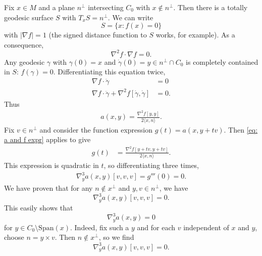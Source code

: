 \documentclass{article}
\numberwithin{equation}{section}
\theoremstyle{plain}
\begin{document}
    
    Fix $x \in M$ and a plane $n^\perp$ intersecting $C_0$ with $x \notin n^\perp$. Then there is a totally geodesic surface $S$ with $T_x S = n^\perp$. We can write 
    \begin{equation}
    S = \{x : f(x) = 0\}
    \end{equation}
     with $|\nabla f| = 1$ (the signed distance function to $S$ works, for example). As a consequence, 
     \begin{equation}
     \nabla^2 f \cdot\nabla f = 0.
     \end{equation}
      Any geodesic $\gamma$ with $\gamma(0) = x$ and $\dot \gamma(0) = y \in n^\perp \cap C_0$ is completely contained in $S$: $f(\gamma) = 0$. Differentiating this equation twice,
    \begin{align}
        \nabla f \cdot \dot \gamma &= 0 \\
        \nabla f \cdot \ddot \gamma + \nabla^2 f[\dot \gamma, \dot \gamma] &= 0.
    \end{align}
    Thus 
    \begin{align} \label{eq: a and f expr}
        a(x,y) = \frac{ \nabla^2 f[y,y]}{2\langle x,n\rangle}.
    \end{align}
    Fix $v \in n^\perp$ and consider the function expression $g(t) = a(x, y+tv)$. Then \eqref{eq: a and f expr} applies to give 
    \begin{align}
        g(t) &= \frac{ \nabla^2 f[y+tv,y+tv]}{2\langle x,n\rangle}.
    \end{align}
    This expression is quadratic in $t$, so differentiating three times,
    \begin{align}
        \nabla_y^3a(x,y)[v,v,v] = g'''(0) = 0.
    \end{align}
    We have proven that for any $n \notin x^\perp$ and $y,v \in n^\perp$, we have
    \begin{equation}
    \nabla_y^3 a(x,y)[v,v,v] = 0.
    \end{equation}
     This easily shows that 
     \begin{equation}
     \nabla_y^3 a(x,y) = 0
     \end{equation}
      for $y \in C_0 \setminus \mathrm{Span}(x)$. Indeed, fix such a $y$ and for each $v$ independent of $x$ and $y$, choose $n = y \times v$. Then $n \notin x^\perp$, so we find 
      \begin{equation}
      \nabla_y^3 a(x,y)[v,v,v]=0.
      \end{equation}
\end{document}
